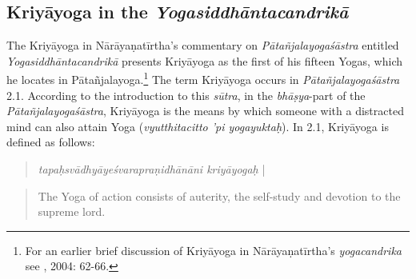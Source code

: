 \subsection{Kriyāyoga in the \textit{Yogasiddhāntacandrikā}}

The Kriyāyoga in Nārāyaṇatīrtha's commentary on \textit{Pātañjalayogaśāstra} entitled \textit{Yogasiddhāntacandrikā} presents Kriyāyoga as the first of his fifteen Yogas, which he locates in Pātañjalayoga.\footnote{For an earlier brief discussion of Kriyāyoga in Nārāyaṇatīrtha's \textit{yogacandrika} see \citeauthor{penna2004}, 2004: 62-66.} The term Kriyāyoga occurs in \textit{Pātañjalayogaśāstra} 2.1. According to the introduction to this \textit{sūtra}, in the \textit{bhāṣya}-part of the \textit{Pātañjalayogaśāstra}, Kriyāyoga is the means by which someone with a distracted mind can also attain Yoga (\textit{vyutthitacitto 'pi yogayuktaḥ}). In  2.1, Kriyāyoga is defined as follows:
\begin{quote}  
  \textit{tapaḥsvādhyāyeśvarapraṇidhānāni kriyāyogaḥ} |
\end{quote}
\begin{quote}
The Yoga of action consists of auterity, the self-study and devotion to the supreme lord. 
\end{quote}

